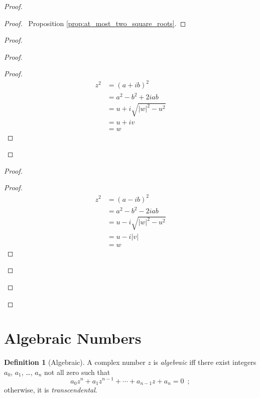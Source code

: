 \documentclass{book}
\let\qed\relax
\theoremstyle{definition}
\newtheorem{df}[prop]{Definition}
\begin{document}
\begin{proof}
\pf
{}
\begin{proof}
	\pf\ Proposition \ref{prop:at_most_two_square_roots}.
\end{proof}
\begin{proof}
	\begin{proof}
		\begin{proof}
			\pf
			\begin{align*}
				z^2 & = (a + ib)^2 \\
				& = a^2 - b^2 + 2iab \\
				& = u + i \sqrt{|w|^2-u^2} \\
				& = u + iv \\
				& = w
			\end{align*}
		\end{proof}
	\end{proof}
	\begin{proof}
		\begin{proof}
			\pf
			\begin{align*}
				z^2 & = (a-ib)^2 \\
				& = a^2 - b^2 -2iab \\
				& = u - i \sqrt{|w|^2 - u^2} \\
				& = u - i |v| \\
				& = w
			\end{align*}
		\end{proof}
	\end{proof}
\end{proof}
\qed
\end{proof}

\section{Algebraic Numbers}

\begin{df}[Algebraic]
A complex number $z$ is \emph{algebraic} iff there exist integers $a_0$, $a_1$, \ldots, $a_n$ not all zero such that
\[ a_0 z^n + a_1 z^{n-1} + \cdots + a_{n-1} z + a_n = 0 \enspace ; \]
otherwise, it is \emph{transcendental}.
\end{df}
\end{document}
